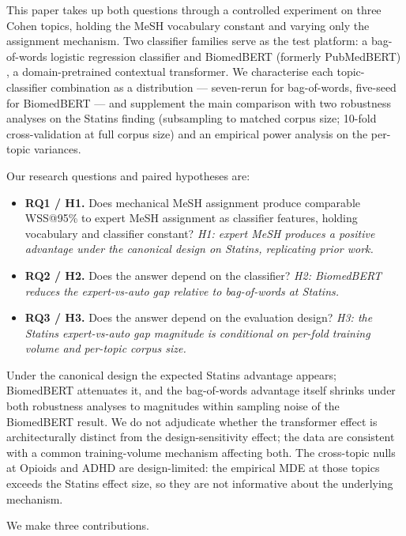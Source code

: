 \documentclass{article}
\begin{document}
This paper takes up both questions through a controlled experiment on three Cohen topics, holding the MeSH vocabulary constant and varying only the assignment mechanism. Two classifier families serve as the test platform: a bag-of-words logistic regression classifier and BiomedBERT (formerly PubMedBERT) \cite{gu2021biomedbert}, a domain-pretrained contextual transformer. We characterise each topic-classifier combination as a distribution --- seven-rerun for bag-of-words, five-seed for BiomedBERT --- and supplement the main comparison with two robustness analyses on the Statins finding (subsampling to matched corpus size; 10-fold cross-validation at full corpus size) and an empirical power analysis on the per-topic variances.

Our research questions and paired hypotheses are:

\begin{itemize}
\item \textbf{RQ1 / H1.} Does mechanical MeSH assignment produce comparable WSS@95\% to expert MeSH assignment as classifier features, holding vocabulary and classifier constant? \textit{H1: expert MeSH produces a positive advantage under the canonical design on Statins, replicating prior work.}
\item \textbf{RQ2 / H2.} Does the answer depend on the classifier? \textit{H2: BiomedBERT reduces the expert-vs-auto gap relative to bag-of-words at Statins.}
\item \textbf{RQ3 / H3.} Does the answer depend on the evaluation design? \textit{H3: the Statins expert-vs-auto gap magnitude is conditional on per-fold training volume and per-topic corpus size.}
\end{itemize}

Under the canonical design the expected Statins advantage appears; BiomedBERT attenuates it, and the bag-of-words advantage itself shrinks under both robustness analyses to magnitudes within sampling noise of the BiomedBERT result. We do not adjudicate whether the transformer effect is architecturally distinct from the design-sensitivity effect; the data are consistent with a common training-volume mechanism affecting both. The cross-topic nulls at Opioids and ADHD are design-limited: the empirical MDE at those topics exceeds the Statins effect size, so they are not informative about the underlying mechanism.

We make three contributions.
\end{document}

